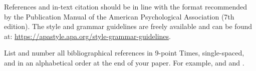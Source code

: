 \documentclass[10pt]{article}
\begin{document}
References and in-text citation should be in line with the format recommended by the Publication Manual of the American Psychological Association (7th edition). The style and grammar guidelines are freely available and can be found at:  \url{https://apastyle.apa.org/style-grammar-guidelines}.

List and number all bibliographical references in 9-point Times, single-spaced, and in an alphabetical order at the end of your paper. For example, \textcite{Castells2010, Allen1997} and \textcite{Bloomberg2018} and \textcite{Allen1997}.





\printbibliography
\end{document}
